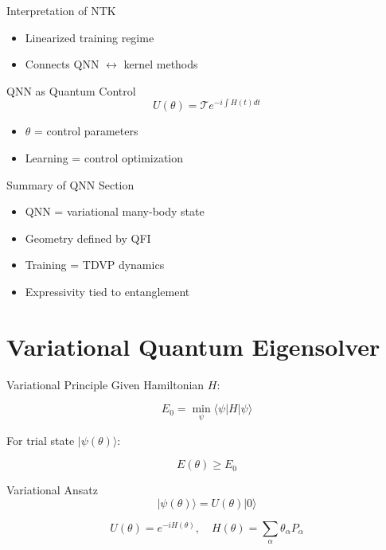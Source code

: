 \documentclass{beamer}
\begin{document}
\begin{frame}{Interpretation of NTK}
\begin{itemize}
\item Linearized training regime
\item Connects QNN $\leftrightarrow$ kernel methods
\end{itemize}
\end{frame}

\begin{frame}{QNN as Quantum Control}
\[
U(\theta)=\mathcal{T} e^{-i\int H(t)dt}
\]

\begin{itemize}
\item $\theta$ = control parameters
\item Learning = control optimization
\end{itemize}
\end{frame}

\begin{frame}{Summary of QNN Section}
\begin{itemize}
\item QNN = variational many-body state
\item Geometry defined by QFI
\item Training = TDVP dynamics
\item Expressivity tied to entanglement
\end{itemize}
\end{frame}

\section{Variational Quantum Eigensolver}

\begin{frame}{Variational Principle}
Given Hamiltonian $H$:

\[
E_0 = \min_{\psi} \langle \psi | H | \psi \rangle
\]

For trial state $|\psi(\theta)\rangle$:

\[
E(\theta) \ge E_0
\]
\end{frame}

\begin{frame}{Variational Ansatz}
\[
|\psi(\theta)\rangle = U(\theta)|0\rangle
\]

\[
U(\theta)=e^{-iH(\theta)}, \quad H(\theta)=\sum_\alpha \theta_\alpha P_\alpha
\]
\end{frame}
\end{document}
